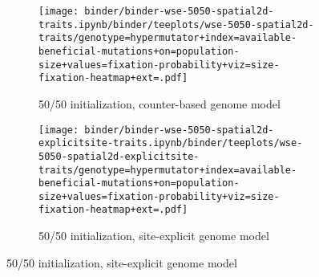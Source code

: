 \begin{figure}[h]
    \begin{subfigure}[b]{0.5\linewidth}
        \begin{minipage}{\linewidth}
          \texttt{[image: binder/binder-wse-5050-spatial2d-traits.ipynb/binder/teeplots/wse-5050-spatial2d-traits/genotype=hypermutator+index=available-beneficial-mutations+on=population-size+values=fixation-probability+viz=size-fixation-heatmap+ext=.pdf]}%
        \end{minipage}
        \begin{minipage}{\linewidth}
        \caption{50/50 initialization, counter-based genome model}
        \label{fig:fixheat-wse-256atile:5050}
        \end{minipage}%
    \end{subfigure}%
    \begin{subfigure}[b]{0.5\linewidth}
        \begin{minipage}{\linewidth}
          \texttt{[image: binder/binder-wse-5050-spatial2d-explicitsite-traits.ipynb/binder/teeplots/wse-5050-spatial2d-explicitsite-traits/genotype=hypermutator+index=available-beneficial-mutations+on=population-size+values=fixation-probability+viz=size-fixation-heatmap+ext=.pdf]}%
        \end{minipage}
        \begin{minipage}{\linewidth}
        \caption{50/50 initialization, site-explicit genome model}
        \label{fig:fixheat-wse-256atile:5050-explicitsite}
        \end{minipage}%
    \end{subfigure}


\end{figure}
